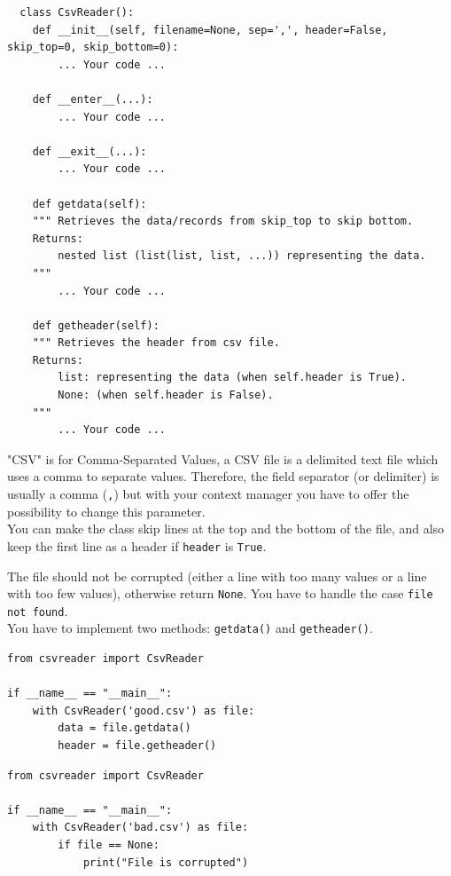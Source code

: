 \documentclass{42-en}
\begin{document}
\begin{verbatim}
  class CsvReader():
	def __init__(self, filename=None, sep=',', header=False, skip_top=0, skip_bottom=0):
		... Your code ...

	def __enter__(...):
		... Your code ...
	
	def __exit__(...):
		... Your code ...
	
	def getdata(self):
	""" Retrieves the data/records from skip_top to skip bottom.
	Returns:
		nested list (list(list, list, ...)) representing the data.
	"""
		... Your code ...

	def getheader(self):
	""" Retrieves the header from csv file.
	Returns:
		list: representing the data (when self.header is True).
        None: (when self.header is False).
	"""
		... Your code ...
\end{verbatim}

"CSV" is for Comma-Separated Values, a CSV file is a delimited text file which uses
a comma to separate values.
Therefore, the field separator (or delimiter) is usually a comma (\texttt{,})
but with your context manager you have to offer the possibility to change this parameter.\\


You can make the class skip lines at the top and the bottom of the file,
and also keep the first line as a header if \texttt{header} is \texttt{True}.


The file should not be corrupted (either a line with too many values or a line
with too few values), otherwise return \texttt{None}.
You have to handle the case \texttt{file not found}.\\
You have to implement two methods: \texttt{getdata()} and \texttt{getheader()}.

\begin{verbatim}
from csvreader import CsvReader

if __name__ == "__main__":
	with CsvReader('good.csv') as file:
		data = file.getdata()
		header = file.getheader()
\end{verbatim}

\begin{verbatim}
from csvreader import CsvReader

if __name__ == "__main__":
	with CsvReader('bad.csv') as file:
		if file == None:
			print("File is corrupted")
\end{verbatim}
\end{document}
